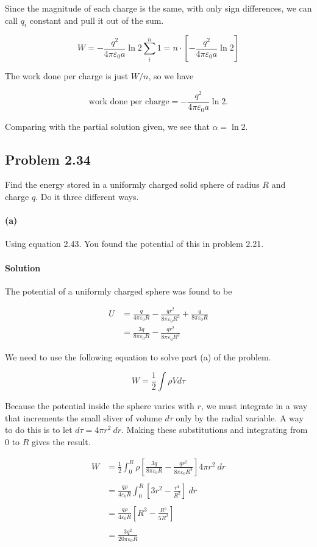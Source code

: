 \documentclass{article}
\begin{document}
Since the magnitude of each charge is the same, with only sign differences, we can call $q_i$ constant and pull it out of the sum. 

$$
W = -\frac{q^2}{4\pi\varepsilon_0a}\ln{2}\sum_i^n 1 = n \cdot\left[ -\frac{q^2}{4\pi\varepsilon_0a}\ln{2} \right]
$$

The work done per charge is just $W / n$, so we have 

$$
\text{work done per charge} = -\frac{q^2}{4\pi\varepsilon_0a}\ln{2}.
$$

Comparing with the partial solution given, we see that $\alpha = \ln 2$.

\newpage

\subsection*{Problem 2.34} 
Find the energy stored in a uniformly charged solid sphere of radius $R$ and charge $q$. Do it three different ways.

\paragraph{(a)} Using equation 2.43. You found the potential of this in problem 2.21. 

\paragraph{Solution} The potential of a uniformly charged sphere was found to be 

 \begin{align*}
      U &= \frac{q}{4\pi \varepsilon_0R} - \frac{qr^2}{8\pi\varepsilon_0R^3} + \frac{q}{8\pi\varepsilon_0R} \\
      &= \frac{3q}{8\pi\varepsilon_0R} - \frac{qr^2}{8\pi\varepsilon_0R^3}
 \end{align*}

We need to use the following equation to solve part (a) of the problem. 

$$W = \frac{1}{2}\int \rho V d\tau$$

Because the potential inside the sphere varies with $r$, we must integrate in a way that increments the small sliver of volume $d\tau$ only by the radial variable. A way to do this is to let $d\tau = 4\pi r^2\ dr$. Making these substitutions and integrating from 0 to $R$ gives the result.

\begin{align*}
    W &= \frac{1}{2}\int_0^R \rho \left[ \frac{3q}{8\pi\varepsilon_0R} - \frac{qr^2}{8\pi\varepsilon_0R^3} \right] 4\pi r^2\ dr \\
    \\
    &= \frac{q\rho}{4\varepsilon_0R} \int_0^R \left[3r^2 - \frac{r^4}{R^2} \right]\ dr \\
    \\
    &= \frac{q\rho}{4\varepsilon_0R}\left[ R^3 - \frac{R^5}{5R^2} \right] \\
    \\
    &= \frac{3q^2}{20\pi\varepsilon_0R}
\end{align*}
\end{document}
